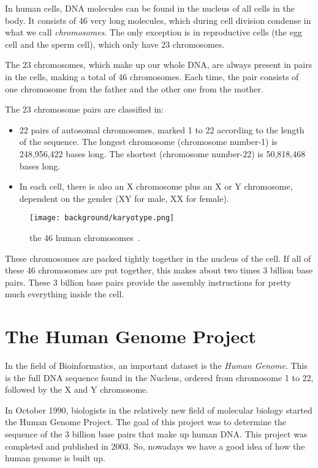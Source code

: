 In human cells, DNA molecules can be found in the nucleus of all cells in the body. It consists of 46 very long molecules, which during cell division condense in what we call \emph{chromosomes}. The only exception is in reproductive cells (the egg cell and the sperm cell), which only have 23 chromosomes. 

The 23 chromosomes, which make up our whole DNA, are always present in pairs in the cells, making a total of 46 chromosomes. Each time, the pair consists of one chromosome from the father and the other one from the mother. 

The 23 chromosome pairs are classified in:
\begin{itemize}
	\item 22 pairs of autosomal chromosomes, marked 1 to 22 according to the length of the sequence. The longest chromosome (chromosome number-1) is 248,956,422 bases long. The shortest (chromosome number-22) is 50,818,468 bases long.
	\item In each cell, there is also an X chromosome plus an X or Y chromosome, dependent on the gender (XY for male, XX for female).
\end{itemize}


\begin{figure}[H]
	\centering
	\texttt{[image: background/karyotype.png]}
	\caption{the 46 human chromosomes~\cite{8}.}
	\label{fig:karyotype}
\end{figure}

These chromosomes are packed tightly together in the nucleus of the cell. If all of these 46 chromosomes are put together, this makes about two times 3 billion base pairs. These 3 billion base pairs provide the assembly instructions for pretty much everything inside the cell.


\section{The Human Genome Project}

In the field of Bioinformatics, an important dataset is the \emph{Human Genome}. This is the full DNA sequence found in the Nucleus, ordered from chromosome 1 to 22, followed by the X and Y chromosome.

In October 1990, biologists in the relatively new field of molecular biology started the Human Genome Project. The goal of this project was to determine the sequence of the 3 billion base pairs that make up human DNA. This project was completed and published in 2003. So, nowadays we have a good idea of how the human genome is built up.

